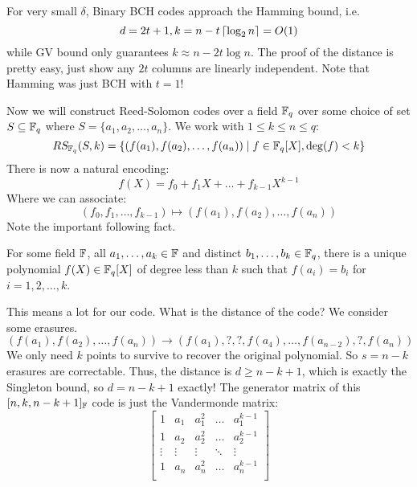 For very small $\delta$, Binary BCH codes approach the Hamming bound, i.e.
\[ d = 2t + 1, k = n - t \left\lceil \log_2 n \right\rceil = O(1) \]
while GV bound only guarantees $k \approx n - 2t \log n$.
The proof of the distance is pretty easy, just show any $2t$ columns are linearly independent.
Note that Hamming was just BCH with $t = 1$!

Now we will construct Reed-Solomon codes over a field
$\operatorname{\mathbb{F}}_q$ over some choice of set $S \subseteq \operatorname{\mathbb{F}}_q$ where $S = \{a_1, a_2, \dots, a_n\}$. We work with $1 \leq k \leq n \leq q$:
\[ RS_{\operatorname{\mathbb{F}}_q}(S, k) = \{ (f(a_1), f(a_2), \dots, f(a_n)) \mid f \in \operatorname{\mathbb{F}}_q[X], \deg(f) < k \} \]
There is now a natural encoding:
\[ f(X) = f_0 + f_1 X + \dots + f_{k - 1} X^{k - 1} \]
Where we can associate:
\[ (f_0, f_1, \dots, f_{k - 1}) \mapsto (f(a_1), f(a_2), \dots, f(a_n)) \]
Note the important following fact.
\begin{theorem}[Interpolation]
    For some field $\operatorname{\mathbb{F}}$, all $a_1, \dots, a_k \in \operatorname{\mathbb{F}}$ and distinct $b_1, \dots, b_k \in \operatorname{\mathbb{F}}_q$,
    there is a unique polynomial $f(X) \in \operatorname{\mathbb{F}}_q[X]$
    of degree less than $k$ such that $f(a_i) = b_i$ for $i = 1, 2, \dots, k$.
\end{theorem}
This means a lot for our code. What is the distance of the code? We consider some erasures.
\[ (f(a_1), f(a_2), \dots, f(a_n)) \to (f(a_1), ?, ?, f(a_4), \dots, f(a_{n - 2}), ?, f(a_n)) \]
We only need $k$ points to survive to recover the original polynomial. So $s = n - k $ erasures are correctable.
Thus, the distance is $d \geq n - k + 1$,
which is exactly the Singleton bound, so $d = n - k + 1$ exactly!
The generator matrix of this $[n, k, n - k + 1]_{\operatorname{\mathbb{F}}}$ code is just the Vandermonde matrix:
\[ \begin{bmatrix}
    1 & a_1 & a_1^2 & \dots & a_1^{k - 1} \\
    1 & a_2 & a_2^2 & \dots & a_2^{k - 1} \\
    \vdots & \vdots & \vdots & \ddots & \vdots \\
    1 & a_n & a_n^2 & \dots & a_n^{k - 1} \\
\end{bmatrix} \]
